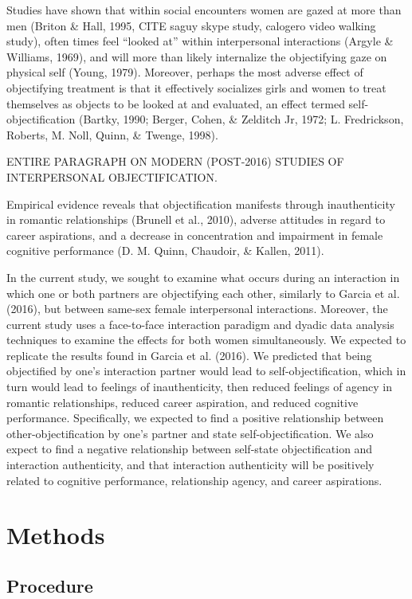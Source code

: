 \documentclass[man]{apa6}
\begin{document}
Studies have shown that within social encounters women are gazed at more
than men (Briton \& Hall, 1995, CITE saguy skype study, calogero video
walking study), often times feel \enquote{looked at} within
interpersonal interactions (Argyle \& Williams, 1969), and will more
than likely internalize the objectifying gaze on physical self (Young,
1979). Moreover, perhaps the most adverse effect of objectifying
treatment is that it effectively socializes girls and women to treat
themselves as objects to be looked at and evaluated, an effect termed
self-objectification (Bartky, 1990; Berger, Cohen, \& Zelditch Jr, 1972;
L. Fredrickson, Roberts, M. Noll, Quinn, \& Twenge, 1998).

ENTIRE PARAGRAPH ON MODERN (POST-2016) STUDIES OF INTERPERSONAL
OBJECTIFICATION.

Empirical evidence reveals that objectification manifests through
inauthenticity in romantic relationships (Brunell et al., 2010), adverse
attitudes in regard to career aspirations, and a decrease in
concentration and impairment in female cognitive performance (D. M.
Quinn, Chaudoir, \& Kallen, 2011).

In the current study, we sought to examine what occurs during an
interaction in which one or both partners are objectifying each other,
similarly to Garcia et al. (2016), but between same-sex female
interpersonal interactions. Moreover, the current study uses a
face-to-face interaction paradigm and dyadic data analysis techniques to
examine the effects for both women simultaneously. We expected to
replicate the results found in Garcia et al. (2016). We predicted that
being objectified by one's interaction partner would lead to
self-objectification, which in turn would lead to feelings of
inauthenticity, then reduced feelings of agency in romantic
relationships, reduced career aspiration, and reduced cognitive
performance. Specifically, we expected to find a positive relationship
between other-objectification by one's partner and state
self-objectification. We also expect to find a negative relationship
between self-state objectification and interaction authenticity, and
that interaction authenticity will be positively related to cognitive
performance, relationship agency, and career aspirations.

\section{Methods}\label{methods}

\subsection{Procedure}\label{procedure}
\end{document}
